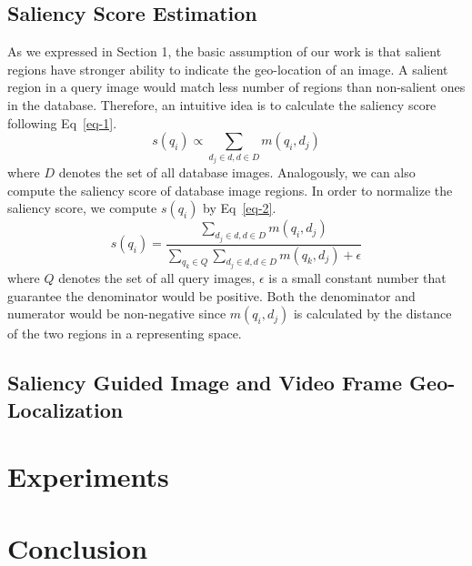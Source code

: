 \subsection{Saliency Score Estimation}
\par
As we expressed in Section 1, the basic assumption of our work is that salient regions have stronger ability to indicate the geo-location of an image. A salient region in a query image would match less number of regions than non-salient ones in the database. Therefore, an intuitive idea is to calculate the saliency score following Eq~\eqref{eq-1}.
\begin{equation}
s(q_i) \propto \sum_{d_j \in d, d \in D} m(q_i, d_j)
\label{eq-1}
\end{equation}
where $D$ denotes the set of all database images. Analogously, we can also compute the saliency score of database image regions. In order to normalize the saliency score, we compute $s(q_i)$ by Eq~\eqref{eq-2}.
\begin{equation}
s(q_i) = \frac{\sum_{d_j \in d, d \in D} m(q_i, d_j)}{\sum_{q_k \in Q}\sum_{d_j \in d, d \in D} m(q_k, d_j) + \epsilon}
\label{eq-2}
\end{equation}
where $Q$ denotes the set of all query images, $\epsilon$ is a small constant number that guarantee the denominator would be positive. Both the denominator and numerator would be non-negative since $m(q_i, d_j)$ is calculated by the distance of the two regions in a representing space. 
\subsection{Saliency Guided Image and Video Frame Geo-Localization}
\par

\section{Experiments}

\section{Conclusion}
